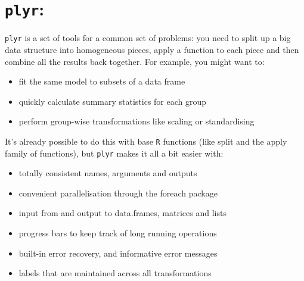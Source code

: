 \documentclass[12pt]{article}
\begin{document}
\section{\texttt{plyr}: }

\texttt{plyr} is a set of tools for a common set of problems: you need to split up a big data structure into homogeneous pieces, apply a function to each piece and then combine all the results back together. For example, you might want to:

\begin{itemize}
\item fit the same model to subsets of a data frame
\item quickly calculate summary statistics for each group
\item perform group-wise transformations like scaling or standardising
\end{itemize}
It’s already possible to do this with base \texttt{R} functions (like split and the apply family of functions), but \texttt{plyr} makes it all a bit easier with:

\begin{itemize}
\item totally consistent names, arguments and outputs
\item convenient parallelisation through the foreach package
\item input from and output to data.frames, matrices and lists
\item progress bars to keep track of long running operations
\item built-in error recovery, and informative error messages
\item labels that are maintained across all transformations
\end{itemize}
\end{document}
